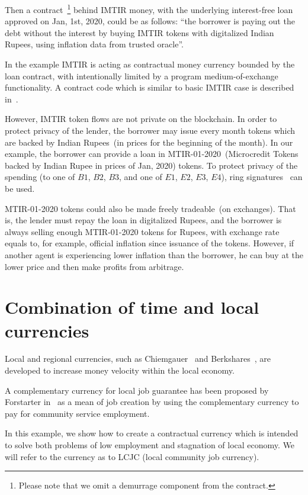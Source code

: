 \documentclass[]{llncs}   %
\begin{document}
  Then a contract~\footnote{Please note that we omit a demurrage component from
 the contract.} behind IMTIR money, with the underlying interest-free loan approved on Jan, 1st, 2020,
 could be as follows: ``the borrower is paying out the debt without the interest by buying IMTIR tokens with digitalized Indian Rupees, using inflation data from trusted oracle''.
 
 In the example IMTIR is acting as contractual money currency bounded by the loan contract, with intentionally limited by a
 program medium-of-exchange functionality. A contract code which is similar to basic IMTIR case is described in~\cite{scpeople}.

 However, IMTIR token flows are not private on the blockchain. In order to protect privacy of the lender, the borrower
 may issue every month tokens which are backed by Indian Rupees~(in prices for the beginning of the month). In our example, the
 borrower can provide a loan in MTIR-01-2020~(Microcredit Tokens backed by Indian Rupee in prices of
 Jan, 2020) tokens. To protect privacy of the spending (to one of $B1$, $B2$, $B3$, and one of $E1$, $E2$, $E3$, $E4$), ring
 signatures~\cite{rivest2001leak} can be used.

 MTIR-01-2020 tokens could also be made freely tradeable~(on exchanges). That is, the lender must repay the loan in
 digitalized Rupees, and the borrower is always selling enough MTIR-01-2020 tokens for Rupees, with exchange rate equals
 to, for example, official inflation since issuance of the tokens. However, if another agent is experiencing lower inflation
 than the borrower, he can buy at the lower price and then make profits from arbitrage.

\section{Combination of time and local currencies}
\label{sec-combination}

Local and regional currencies, such as Chiemgauer~\cite{thiel2011complementary} and Berkshares~\cite{swann1995local}, are developed to increase money velocity within the local economy.

A complementary currency for local job guarantee has been proposed by Forstarter in~\cite{forstater2018complementary} as a mean
of job creation by using the complementary currency to pay for community service employment.

In this example, we show how to create a contractual currency which is intended to solve both problems of low
employment and stagnation of local economy. We will refer to the currency as to LCJC (local community job currency).
\end{document}

